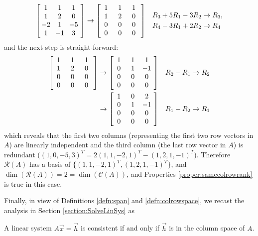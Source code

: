 \begin{solution}
\begin{align*}
\left[\begin{array}{@{\;}wc{10pt}wc{10pt}wc{10pt}wc{10pt}@{\;}}
1 & 1 & 1 \\
1 & 2 & 0 \\
-2 & 1 & -5 \\
1 & -1 & 3
\end{array}\right] 
&\rightarrow
\left[\begin{array}{@{\;}wc{10pt}wc{10pt}wc{10pt}wc{10pt}@{\;}}
1 & 1 & 1 \\
1 & 2 & 0 \\
0 & 0 & 0 \\
0 & 0 & 0
\end{array}\right] 
& \begin{aligned}
R_3 + 5R_1 - 3R_2 &\to R_3, \\
R_4 - 3R_1 + 2R_2 &\to R_4
\end{aligned}
\end{align*}
and the next step is straight-forward:
\begin{align*}
\left[\begin{array}{@{\;}wc{10pt}wc{10pt}wc{10pt}wc{10pt}@{\;}}
1 & 1 & 1 \\
1 & 2 & 0 \\
0 & 0 & 0 \\
0 & 0 & 0
\end{array}\right] 
&\rightarrow
\left[\begin{array}{@{\;}wc{10pt}wc{10pt}wc{10pt}wc{10pt}@{\;}}
1 & 1 & 1 \\
0 & 1 & -1 \\
0 & 0 & 0 \\
0 & 0 & 0
\end{array}\right] 
& R_2 - R_1 \to R_2 \\
&\rightarrow
\left[\begin{array}{@{\;}wc{10pt}wc{10pt}wc{10pt}wc{10pt}@{\;}}
1 & 0 & 2 \\
0 & 1 & -1 \\
0 & 0 & 0 \\
0 & 0 & 0
\end{array}\right] 
& R_1 - R_2 \to R_1
\end{align*}
which reveals that the first two columns (representing the first two row vectors in $A$) are linearly independent and the third column (the last row vector in $A$) is redundant ($(1,0,-5,3)^T = 2(1,1,-2,1)^T-(1,2,1,-1)^T$). Therefore $\mathcal{R}(A)$ has a basis of $\{(1,1,-2,1)^T, (1,2,1,-1)^T\}$, and $\dim(\mathcal{R}(A)) = 2 = \dim(\mathcal{C}(A))$, and Properties \ref{proper:samecolrowrank} is true in this case.
\end{solution}
Finally, in view of Definitions \ref{defn:span} and \ref{defn:colrowspace}, we recast the analysis in Section \ref{section:SolveLinSys} as 
\begin{proper}
A linear system $A\vec{x} = \vec{h}$ is consistent if and only if $\vec{h}$ is in the column space of $A$.
\end{proper}

